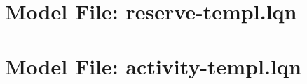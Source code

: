 \documentclass[11pt]{article}
\begin{document}
\section{Model File: reserve-templ.lqn}
\label{sec:reserve-templ}
\lstset{basicstyle=\ttfamily\footnotesize,stringstyle=\emph,columns=fullflexible}

\clearpage
\section{Model File: activity-templ.lqn}
\label{activity-templ}

\clearpage
\printindex
\end{document}
